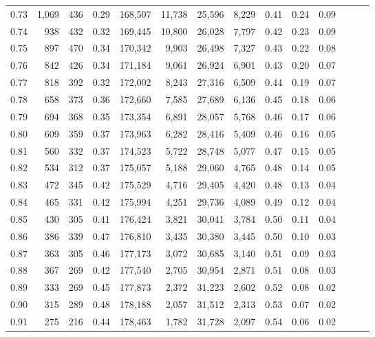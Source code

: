 \begin{tabular}{rrrrrrrrrrrrrr}
0.73 &  1,069 &  436 &  0.29 &  168,507 &   11,738 &  25,596 &   8,229 &  0.41 &  0.24 &      0.09 \\
0.74 &    938 &  432 &  0.32 &  169,445 &   10,800 &  26,028 &   7,797 &  0.42 &  0.23 &      0.09 \\
0.75 &    897 &  470 &  0.34 &  170,342 &    9,903 &  26,498 &   7,327 &  0.43 &  0.22 &      0.08 \\
0.76 &    842 &  426 &  0.34 &  171,184 &    9,061 &  26,924 &   6,901 &  0.43 &  0.20 &      0.07 \\
0.77 &    818 &  392 &  0.32 &  172,002 &    8,243 &  27,316 &   6,509 &  0.44 &  0.19 &      0.07 \\
0.78 &    658 &  373 &  0.36 &  172,660 &    7,585 &  27,689 &   6,136 &  0.45 &  0.18 &      0.06 \\
0.79 &    694 &  368 &  0.35 &  173,354 &    6,891 &  28,057 &   5,768 &  0.46 &  0.17 &      0.06 \\
0.80 &    609 &  359 &  0.37 &  173,963 &    6,282 &  28,416 &   5,409 &  0.46 &  0.16 &      0.05 \\
0.81 &    560 &  332 &  0.37 &  174,523 &    5,722 &  28,748 &   5,077 &  0.47 &  0.15 &      0.05 \\
0.82 &    534 &  312 &  0.37 &  175,057 &    5,188 &  29,060 &   4,765 &  0.48 &  0.14 &      0.05 \\
0.83 &    472 &  345 &  0.42 &  175,529 &    4,716 &  29,405 &   4,420 &  0.48 &  0.13 &      0.04 \\
0.84 &    465 &  331 &  0.42 &  175,994 &    4,251 &  29,736 &   4,089 &  0.49 &  0.12 &      0.04 \\
0.85 &    430 &  305 &  0.41 &  176,424 &    3,821 &  30,041 &   3,784 &  0.50 &  0.11 &      0.04 \\
0.86 &    386 &  339 &  0.47 &  176,810 &    3,435 &  30,380 &   3,445 &  0.50 &  0.10 &      0.03 \\
0.87 &    363 &  305 &  0.46 &  177,173 &    3,072 &  30,685 &   3,140 &  0.51 &  0.09 &      0.03 \\
0.88 &    367 &  269 &  0.42 &  177,540 &    2,705 &  30,954 &   2,871 &  0.51 &  0.08 &      0.03 \\
0.89 &    333 &  269 &  0.45 &  177,873 &    2,372 &  31,223 &   2,602 &  0.52 &  0.08 &      0.02 \\
0.90 &    315 &  289 &  0.48 &  178,188 &    2,057 &  31,512 &   2,313 &  0.53 &  0.07 &      0.02 \\
0.91 &    275 &  216 &  0.44 &  178,463 &    1,782 &  31,728 &   2,097 &  0.54 &  0.06 &      0.02 \\

\end{tabular}
